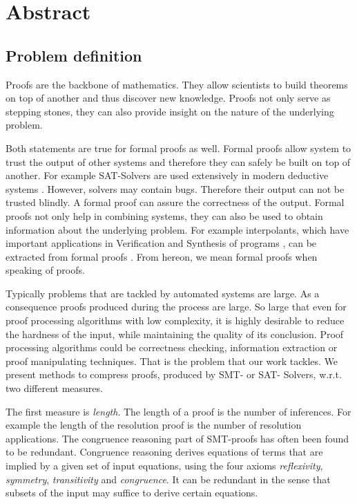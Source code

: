 \chapter*{Abstract}

\section{Problem definition}

Proofs are the backbone of mathematics. 
They allow scientists to build theorems on top of another and thus discover new knowledge.
Proofs not only serve as stepping stones, they can also provide insight on the nature of the underlying problem.

Both statements are true for formal proofs as well.
Formal proofs allow system to trust the output of other systems and therefore they can safely be built on top of another. 
For example SAT-Solvers are used extensively in modern deductive systems \cite{Biere2009}. 
However, solvers may contain bugs. 
Therefore their output can not be trusted blindly.
A formal proof can assure the correctness of the output.
Formal proofs not only help in combining systems, they can also be used to obtain information about the underlying problem.
For example interpolants, which have important applications in Verification and Synthesis of programs \cite{McMill2005}, can be extracted from formal proofs \cite{Hofferek2013}.
From hereon, we mean formal proofs when speaking of proofs.

Typically problems that are tackled by automated systems are large. 
As a consequence proofs produced during the process are large.
So large that even for proof processing algorithms with low complexity, it is highly desirable to reduce the hardness of the input, while maintaining the quality of its conclusion.
Proof processing algorithms could be correctness checking, information extraction or proof manipulating techniques.
That is the problem that our work tackles.
We present methods to compress proofs, produced by SMT- or SAT- Solvers, w.r.t. two different measures.

The first measure is \emph{length}.
The length of a proof is the number of inferences.
For example the length of the resolution proof is the number of resolution applications.
The congruence reasoning part of SMT-proofs has often been found to be redundant.
Congruence reasoning derives equations of terms that are implied by a given set of input equations, 
using the four axioms \emph{reflexivity}, \emph{symmetry}, \emph{transitivity} and \emph{congruence}. 
It can be redundant in the sense that subsets of the input may suffice to derive certain equations.

